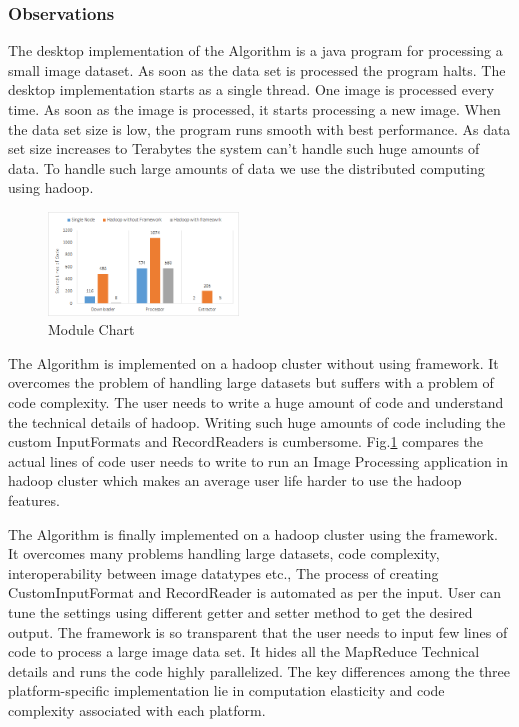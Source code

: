 \documentclass[conference]{IEEEtran}
\begin{document}
\subsubsection{Observations}   

The desktop implementation of the Algorithm is a java program for processing a small image dataset. As soon as the data set is processed the program halts. The desktop implementation starts as a single thread. One image is processed every time. As soon as the image is processed, it starts processing a new image. When the data set size is low, the program runs smooth with best performance. As data set size increases to Terabytes the system can't handle such huge amounts of data. To handle such large amounts of data we use the distributed computing using hadoop.


\begin{figure}[h]
	\centering
	\includegraphics[width=0.45\textwidth]{module-chart}
	\caption{Module Chart}
	\label{fig:module-chart}
\end{figure}
 

The Algorithm is implemented on a hadoop cluster without using framework. It overcomes the problem of handling large datasets but suffers with a problem of code complexity. The user needs to write a huge amount of code and understand the technical details of hadoop. Writing such huge amounts of code including the custom InputFormats and RecordReaders is cumbersome. Fig.\ref{fig:module-chart} compares the actual lines of code user needs to write to run an Image Processing application in hadoop cluster which makes an average user life harder to use the hadoop features.

The Algorithm is finally implemented on a hadoop cluster using the framework. It overcomes many problems handling large datasets, code complexity, interoperability between image datatypes etc., The process of creating CustomInputFormat and RecordReader is automated as per the input. User can tune the settings using different getter and setter method to get the desired output. The framework is so transparent that the user needs to input few lines of code to process a large image data set. It hides all the MapReduce Technical details and runs the code highly parallelized. The key differences among the three platform-specific implementation lie in computation elasticity and code complexity associated with each platform.
\end{document}
